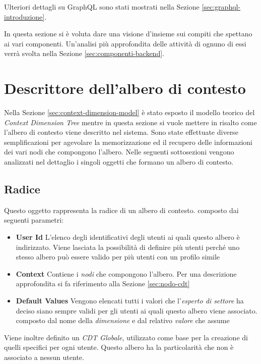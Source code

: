 Ulteriori dettagli su GraphQL sono stati mostrati nella Sezione \ref{sec:graphql-introduzione}. 

In questa sezione si è voluta dare una visione d'insieme sui compiti che spettano ai vari componenti. Un'analisi più approfondita delle attività di ognuno di essi verrà svolta nella Sezione \ref{sec:componenti-backend}.

\section{Descrittore dell'albero di contesto\label{sec:descrittore-albero-contesto}}

Nella Sezione \ref{sec:context-dimension-model} è stato esposto il modello teorico del \emph{Context Dimension Tree} mentre in questa sezione si vuole mettere in risalto come l'albero di contesto viene descritto nel sistema. Sono state effettuate diverse semplificazioni per agevolare la memorizzazione ed il recupero delle informazioni dei vari nodi che compongono l'albero. Nelle seguenti sottosezioni vengono analizzati nel dettaglio i singoli oggetti che formano un albero di contesto.

\subsection{Radice\label{sec:radice-cdt}}

Questo oggetto rappresenta la radice di un albero di contesto. \upe composto dai seguenti parametri:

\begin{itemize}
	\item \textbf{User Id} L'elenco degli identificativi degli utenti ai quali questo albero è indirizzato. Viene lasciata la possibilità di definire più utenti perché uno stesso albero può essere valido per più utenti con un profilo simile
	\item \textbf{Context} Contiene i \emph{nodi} che compongono l'albero. Per una descrizione approfondita si fa riferimento alla Sezione \ref{sec:nodo-cdt}
	\item \textbf{Default Values} Vengono elencati tutti i valori che l'\emph{esperto di settore} ha deciso siano sempre validi per gli utenti ai quali questo albero viene associato. \upe composto dal nome della \emph{dimensione} e dal relativo \emph{valore} che assume
\end{itemize}

Viene inoltre definito un \emph{CDT Globale}, utilizzato come base per la creazione di quelli specifici per ogni utente. Questo albero ha la particolarità che non è associato a nessun utente.

